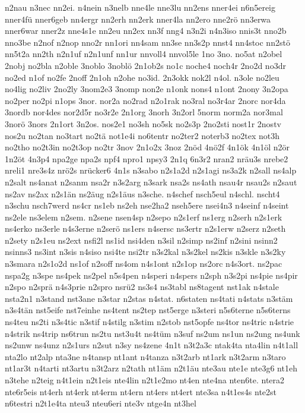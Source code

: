 {n2nau
n3nec
nn2ei.
n4nein
n3nelb
nne4le
nne3lu
nn2ens
nner4ei
n6n5ereig
nner4fü
nner6geb
nn4ergr
nn2erh
nn2erk
nner4la
nn2ero
nne2rö
nn3erwa
nner6war
nner2z
nne4s1e
nn2eu
nn2ex
nn3f
nng4
n3n2i
n4n3iso
nnis3t
nno2b
nno3be
n2nof
n2nop
nno2r
nn1ori
nn4sam
nn3se
nn3s2p
nnst4
nn4stoc
nn2stö
nn5t2a
nn2th
n2n1uf
n2n1unf
nn1ur
nnvoll4
nnvol5le
1no
3no.
no5at
n2obel
2nobj
no2bla
n2oble
3noblo
3noblö
2n1ob2s
no1c
noche4
noch4r
2no2d
no3dr
no2ed
n1of
no2fe
2noff
2n1oh
n2ohe
no3id.
2n3okk
nok2l
n4ol.
n3ole
no2leu
no4lig
no2liv
2no2ly
3nom2e3
3nomp
non2e
n1onk
nons4
n1ont
2nony
3n2opa
no2per
no2pi
n1ops
3nor.
nor2a
no2rad
n2o1rak
no3ral
no3r4ar
2norc
nor4da
3nordb
nor4des
nor2d5r
no3r2e
2n1org
3norh
3n2orl
5norm
norm2a
nor3mal
3norö
3nors
2n1ort
3n2os.
nos2e1
no3sh
no5sk
no2s3p
2no2sti
nost1r
2nostv
nos2u
no2tan
no3tart
no2tä
not1e4i
no6tentr
no2ter2
noterb3
no2tex
not3h
no2tho
no2t3in
no2t3op
no2tr
3nov
2n1o2x
3noz
2nöd
4nö2f
4n1ök
4n1öl
n2ör
1n2öt
4n3p4
npa2ge
npa2s
npf4
npro1
npsy3
2n1q
6n3r2
nran2
nräu3s
nrebe2
nreli1
nre3s4z
nrö2s
nrücker6
4n1s
n3sabo
n2s1a2d
n2s1agi
ns3a2k
n2sall
ns4alp
n2salt
ns4anat
n2sanm
nsa2r
n3s2arg
n3sark
nsa2s
ns4ath
nsau4r
nsau2s
n2saut
ns2av
ns2ax
n2s1än
ns2äug
n2s1äus
n3sche.
n4schef
nsch5eul
n4schl.
nscht4
n3schu
nsch7werd
ns4cr
ns1eb
ns2eh
nse2ha2
nseh5ere
nsei4n3
n4seinf
n4seint
ns2ele
ns3elem
n2sem.
n2sene
nsen4sp
n2sepo
n2s1erf
ns1erg
n2serh
n2s1erk
ns4erko
ns3erle
n4s3erne
n2serö
ns1ers
n4sersc
ns3ertr
n2s1erw
n2serz
n2seth
n2sety
n2s1eu
ns2ext
nsfi2l
ns1id
nsi4den
n3sil
n2simp
ns2inf
n2sini
nsinn2
nsinns3
ns3int
n3sis
n4siso
nsi4te
nsi2tr
n3s2kal
n3s2kel
ns2kis
n3skle
n3s2ky
n3smara
n2s1o2d
ns1of
n2soff
ns4om
n4s1ont
n2s1op
ns2orc
n4s3ort.
ns2pac
nspa2g
n3spe
ns4pek
ns2pel
n5s4pen
n4speri
n4spers
n2sph
n3s2pi
ns4pie
ns4pir
n2spo
n2sprä
n4s3prie
n2spro
nsrü2
ns3s4
ns3tabl
ns8tagent
nst1ak
n4stale
nsta2n1
n3stand
nst3ane
n3star
n2stas
n4stat.
n6staten
ns4tati
n4stats
n3stäm
n3s4tän
nst5eife
nst7einhe
ns4tent
ns2tep
nst5erge
n3steri
n5s6terne
n5s6terns
ns4teu
ns2ti
n3s4tic
n3stif
n4stilg
n3stim
n2stob
nst5opfe
ns4tor
ns4tric
n4strie
n4strik
ns4trip
ns6trun
ns2tu
nst3u4t
ns4tüm
n3suf
ns2um
ns1un
ns2ung
ns4unk
ns2unw
ns4unz
n2s1urs
n2sut
n3sy
ns4zene
4n1t
n3t2a3c
ntak4ta
nta4lin
n4t1all
nta2lo
nt2alp
nta3ne
n4tansp
nt1ant
n4tanza
n3t2arb
nt1ark
n3t2arm
n3taro
nt1ar3t
n4tarti
nt3artu
n3t2arz
n2tath
nt1äm
n2t1äu
nte3au
nte1e
nte3g6
nt1eh
n3tehe
n2teig
n4t1ein
n2t1eis
nte4lin
n2t1e2mo
nt4en
nte4na
nten6te.
ntera2
nte6r5eis
nt4erh
nt4erk
nt4erm
nt4ern
nt4ers
nt4ert
nte3sa
n4t1es4s
nte2st
n6testri
n2t1e4ta
nteu3
nteu6eri
nte3v
ntge4n
nt3hel
}
